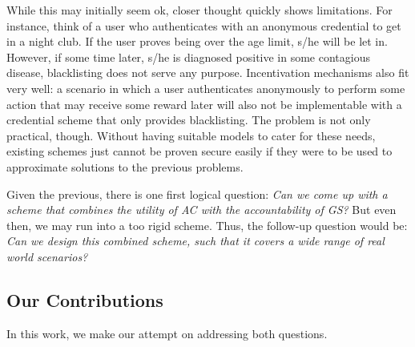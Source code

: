 While this may initially seem ok, closer thought quickly shows limitations. For
instance, think of a user who authenticates with an anonymous credential to get
in a night club. If the user proves being over the age limit, s/he will be let
in. However, if some time later, s/he is diagnosed positive in some contagious
disease, blacklisting does not serve any purpose. Incentivation mechanisms also
fit very well: a scenario in which a user authenticates anonymously to perform
some action that may receive some reward later will also not be implementable
with a credential scheme that only provides blacklisting. The problem is not
only practical, though. Without having suitable models to cater for these needs,
existing schemes just cannot be proven secure easily if they were to be used
to approximate solutions to the previous problems.

Given the previous, there is one first logical question: \emph{Can we come up
  with a scheme that combines the utility of AC with the accountability of
  GS?} But even then, we may run into a too rigid scheme. Thus, the follow-up
question would be: \emph{Can we design this combined scheme, such that it covers
a wide range of real world scenarios?}


\subsection{Our Contributions}
\label{ssec:contributions}

In this work, we make our attempt on addressing both questions.

